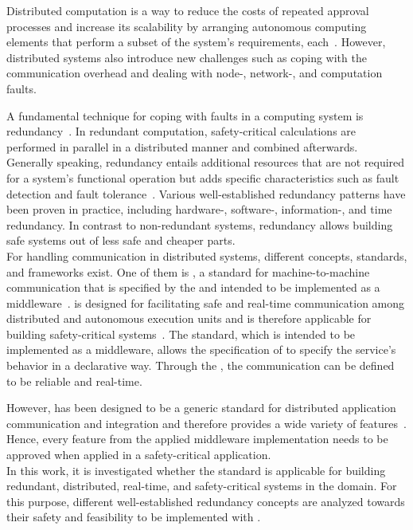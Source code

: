 Distributed computation is a way to reduce the costs of repeated approval processes and increase its scalability by arranging autonomous computing elements that perform a subset of the system's requirements, each~\cite{DistributedSafety2020}.
However, distributed systems also introduce new challenges such as coping with the communication overhead and dealing with node-, network-, and computation faults.

A fundamental technique for coping with faults in a computing system is redundancy~\cite{TanenbaumSteen07}.
In redundant computation, safety-critical calculations are performed in parallel in a distributed manner and combined afterwards.
Generally speaking, redundancy entails additional resources that are not required for a system's functional operation but adds specific characteristics such as fault detection and fault tolerance~\cite{BarryFaultToleranceAnalysis}.
Various well-established redundancy patterns have been proven in practice, including hardware-, software-, information-, and time redundancy.
In contrast to non-redundant systems, redundancy allows building safe systems out of less safe and cheaper parts.
\\

For handling communication in distributed systems, different concepts, standards, and frameworks exist.
One of them is , a  standard for machine-to-machine communication that is specified by the  and intended to be implemented as a middleware~\cite{omgDDSspec}.
 is designed for facilitating safe and real-time communication among distributed and autonomous execution units and is therefore applicable for building safety-critical systems~\cite{DistributedSafety2020}.
The standard, which is intended to be implemented as a middleware, allows the specification of  to specify the service's behavior in a declarative way.
Through the , the communication can be defined to be reliable and real-time.

However,  has been designed to be a generic standard for distributed application communication and integration and therefore provides a wide variety of features~\cite{omgDDSspec}.
Hence, every feature from the applied middleware implementation needs to be approved when applied in a safety-critical application.
\\

In this work, it is investigated whether the  standard is applicable for building redundant, distributed, real-time, and safety-critical systems in the  domain.
For this purpose, different well-established redundancy concepts are analyzed towards their safety and feasibility to be implemented with .

